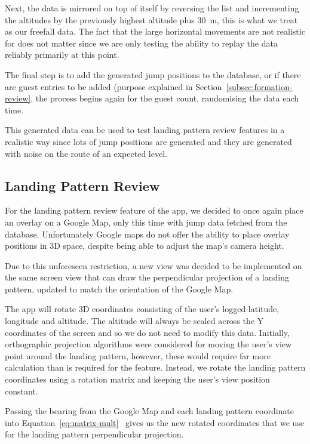 Next, the data is mirrored on top of itself by reversing the list and incrementing the altitudes by the previously highest altitude plus \SI{30}{\metre}, this is what we treat as our freefall data. The fact that the large horizontal movements are not realistic for does not matter since we are only testing the ability to replay the data reliably primarily at this point.

The final step is to add the generated jump positions to the database, or if there are guest entries to be added (purpose explained in Section~\vref{subsec:formation-review}, the process begins again for the guest count, randomising the data each time.

This generated data can be used to test landing pattern review features in a realistic way since lots of jump positions are generated and they are generated with noise on the route of an expected level.

\subsection{Landing Pattern Review}
For the landing pattern review feature of the app, we decided to once again place an overlay on a Google Map, only this time with jump data fetched from the database. Unfortunately Google maps do not offer the ability to place overlay positions in 3D space, despite being able to adjust the map's camera height.

Due to this unforeseen restriction, a new view was decided to be implemented on the same screen view that can draw the perpendicular projection of a landing pattern, updated to match the orientation of the Google Map.

The app will rotate 3D coordinates consisting of the user's logged latitude, longitude and altitude.
The altitude will always be scaled across the Y coordinates of the screen and so we do not need to modify this data. Initially, orthographic projection algorithms were considered for moving the user's view point around the landing pattern, however, these would require far more calculation than is required for the feature. Instead, we rotate the landing pattern coordinates using a rotation matrix and keeping the user's view position constant.

Passing the bearing from the Google Map and each landing pattern coordinate into Equation~\vref{eq:matrix-mult}~\cite{lounesto_clifford_2001} gives us the new rotated coordinates that we use for the landing pattern perpendicular projection.

